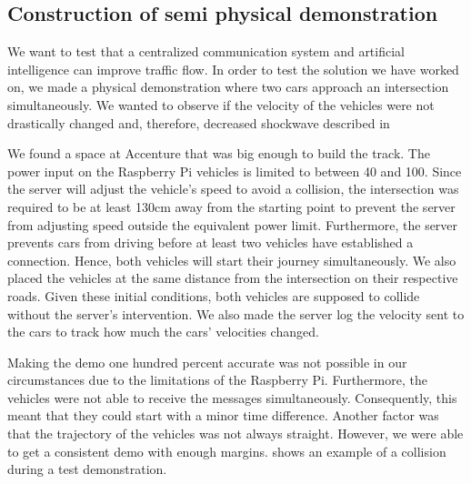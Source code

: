 \subsection{Construction of semi physical demonstration}\label{sec:demo}
We want to test that a centralized communication system and artificial intelligence can improve traffic flow. In order to test the solution we have worked on, we made a physical demonstration where two cars approach an intersection simultaneously. We wanted to observe if the velocity of the vehicles were not drastically changed and, therefore, decreased shockwave described in 

We found a space at Accenture that was big enough to build the track. The power input on the Raspberry Pi vehicles is limited to between 40 and 100. Since the server will adjust the vehicle's speed to avoid a collision, the intersection was required to be at least 130cm away from the starting point to prevent the server from adjusting speed outside the equivalent power limit. Furthermore, the server prevents cars from driving before at least two vehicles have established a connection. Hence, both vehicles will start their journey simultaneously. We also placed the vehicles at the same distance from the intersection on their respective roads. Given these initial conditions, both vehicles are supposed to collide without the server's intervention. We also made the server log the velocity sent to the cars to track how much the cars' velocities changed.

Making the demo one hundred percent accurate was not possible in our circumstances due to the limitations of the Raspberry Pi. Furthermore, the vehicles were not able to receive the messages simultaneously. Consequently, this meant that they could start with a minor time difference. Another factor was that the trajectory of the vehicles was not always straight. However, we were able to get a consistent demo with enough margins.  shows an example of a collision during a test demonstration.


